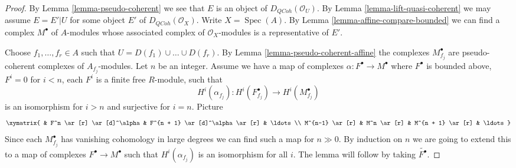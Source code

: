 \documentclass{stacks-project}
\theoremstyle{plain}
\theoremstyle{definition}
\theoremstyle{remark}
\numberwithin{equation}{subsection}
\def\Spec{\mathop{\mathrm{Spec}}}
\def\QCoh{\mathit{QCoh}}
\begin{document}
\begin{proof}
By Lemma \ref{lemma-pseudo-coherent} we see that $E$ is an object of
$D_\QCoh(\mathcal{O}_U)$. By
Lemma \ref{lemma-lift-quasi-coherent}
we may assume $E = E'|U$ for some object $E'$ of
$D_\QCoh(\mathcal{O}_X)$.
Write $X = \Spec(A)$. By Lemma \ref{lemma-affine-compare-bounded}
we can find a complex $M^\bullet$ of $A$-modules whose associated
complex of $\mathcal{O}_X$-modules is a representative of $E'$.

\medskip\noindent
Choose $f_1, \ldots, f_r \in A$ such that $U = D(f_1) \cup \ldots \cup D(f_r)$.
By Lemma \ref{lemma-pseudo-coherent-affine} the complexes
$M^\bullet_{f_j}$ are pseudo-coherent complexes of $A_{f_j}$-modules.
Let $n$ be an integer. Assume we have a map of complexes
$\alpha : F^\bullet \to M^\bullet$ where $F^\bullet$ is
bounded above, $F^i = 0$ for $i < n$, each $F^i$ is a finite free
$R$-module, such that
$$
H^i(\alpha_{f_j}) : H^i(F^\bullet_{f_j}) \to H^i(M^\bullet_{f_j})
$$
is an isomorphism for $i > n$ and surjective for $i = n$. Picture
$$
\xymatrix{
& F^n \ar[r] \ar[d]^\alpha & F^{n + 1} \ar[d]^\alpha \ar[r] & \ldots \\
M^{n-1} \ar[r] & M^n \ar[r] & M^{n + 1} \ar[r] & \ldots
}
$$
Since each $M^\bullet_{f_j}$ has vanishing cohomology
in large degrees we can find such a map for $n \gg 0$.
By induction on $n$ we are going to extend this to a map
of complexes $F^\bullet \to M^\bullet$
such that $H^i(\alpha_{f_j})$ is an isomorphism
for all $i$. The lemma will follow by taking $\widetilde{F^\bullet}$.


\end{proof}
\end{document}
